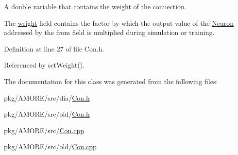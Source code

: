 A double variable that contains the weight of the connection. 

The \hyperlink{class_con_a7f46485ba5b41971ea38641f9e7d1be0}{weight} field contains the factor by which the output value of the \hyperlink{class_neuron}{Neuron} addressed by the from field is multiplied during simulation or training. 

Definition at line 27 of file Con.h.



Referenced by setWeight().



The documentation for this class was generated from the following files:\begin{DoxyCompactItemize}
\item 
pkg/AMORE/src/dia/\hyperlink{dia_2_con_8h}{Con.h}\item 
pkg/AMORE/src/old/\hyperlink{old_2_con_8h}{Con.h}\item 
pkg/AMORE/src/\hyperlink{_con_8cpp}{Con.cpp}\item 
pkg/AMORE/src/old/\hyperlink{old_2_con_8cpp}{Con.cpp}\end{DoxyCompactItemize}
